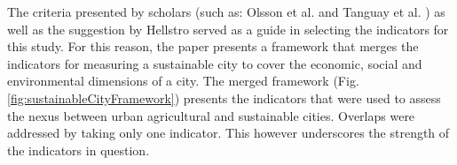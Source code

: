 The criteria presented by scholars (such as: Olsson et al. \cite{Olsson2004} and Tanguay et al. \cite{Tanguay2010}) as well as the suggestion by Hellstro \cite{Hellstrom2000} served as a guide in selecting the indicators for this study. For this reason, the paper presents a framework that merges the indicators for measuring a sustainable city to cover the economic, social and environmental dimensions of a city. The merged framework (Fig. \ref{fig:sustainableCityFramework}) presents the indicators that were used to assess the nexus between urban agricultural and sustainable cities. Overlaps were addressed by taking only one indicator. This however underscores the strength of the indicators in question.


